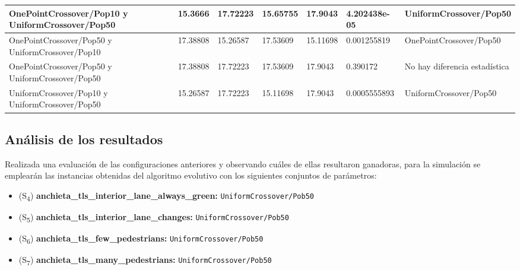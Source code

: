 \begin{table}
{\begin{tabular}{lllllll}
    OnePointCrossover/Pop10 y UniformCrossover/Pop50                    & 15.3666               & 17.72223              & 15.65755              & 17.9043               & 4.202438e-05                                          & UniformCrossover/Pop50                                \\ \hline
    OnePointCrossover/Pop50 y UniformCrossover/Pop10                    & 17.38808              & 15.26587              & 17.53609              & 15.11698              & 0.001255819                                           & OnePointCrossover/Pop50                               \\ \hline
    OnePointCrossover/Pop50 y UniformCrossover/Pop50                    & 17.38808              & 17.72223              & 17.53609              & 17.9043               & 0.390172                                              & No hay diferencia estadística                         \\ \hline
    UniformCrossover/Pop10 y UniformCrossover/Pop50                     & 15.26587              & 17.72223              & 15.11698              & 17.9043               & 0.0005555893                                          & UniformCrossover/Pop50                                \\ \hline
    \end{tabular}}
\end{table}


\subsection{Análisis de los resultados}
\label{subsec:analisis-resultados-configuraciones}

Realizada una evaluación de las configuraciones anteriores y observando cuáles de ellas resultaron ganadoras, para la simulación se emplearán las instancias obtenidas del algoritmo evolutivo con los siguientes conjuntos de parámetros:

\begin{itemize}
    \item (S\textsubscript{4}) \textbf{anchieta\_tls\_interior\_lane\_always\_green:} \texttt{UniformCrossover/Pob50}
    \item (S\textsubscript{5}) \textbf{anchieta\_tls\_interior\_lane\_changes:} \texttt{UniformCrossover/Pob50}
    \item (S\textsubscript{6}) \textbf{anchieta\_tls\_few\_pedestrians:} \texttt{UniformCrossover/Pob50}
    \item (S\textsubscript{7}) \textbf{anchieta\_tls\_many\_pedestrians:} \texttt{UniformCrossover/Pob50}
\end{itemize}

